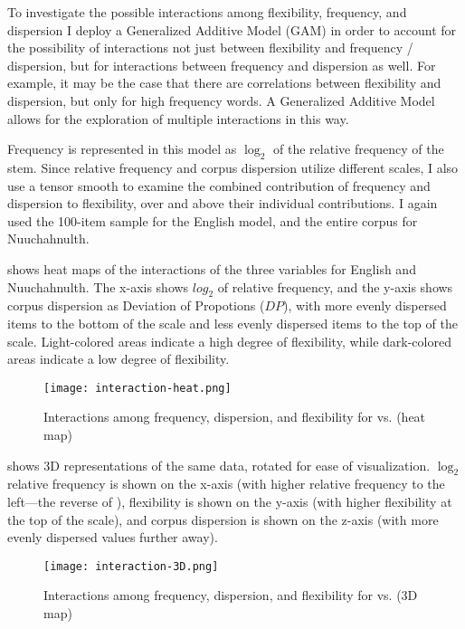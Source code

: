 To investigate the possible interactions among flexibility, frequency, and dispersion I deploy a Generalized Additive Model (GAM) in order to account for the possibility of interactions not just between flexibility and frequency / dispersion, but for interactions between frequency and dispersion as well. For example, it may be the case that there are correlations between flexibility and dispersion, but only for high frequency words. A Generalized Additive Model allows for the exploration of multiple interactions in this way.

Frequency is represented in this model as $\log_2$ of the relative frequency of the stem. Since relative frequency and corpus dispersion utilize different scales, I also use a tensor smooth to examine the combined contribution of frequency and dispersion to flexibility, over and above their individual contributions. I again used the 100-item sample for the English model, and the entire corpus for Nuuchahnulth.

 shows heat maps of the interactions of the three variables for English and Nuuchahnulth. The x-axis shows $log_2$ of relative frequency, and the y-axis shows corpus dispersion as Deviation of Propotions ($DP$), with more evenly dispersed items to the bottom of the scale and less evenly dispersed items to the top of the scale. Light-colored areas indicate a high degree of flexibility, while dark-colored areas indicate a low degree of flexibility.

\begin{figure}
  \centering
  \caption{Interactions among frequency, dispersion, and flexibility for  vs.  (heat map)}
  \label{fig:interaction-heat}
  \texttt{[image: interaction-heat.png]}
\end{figure}

 shows 3D representations of the same data, rotated for ease of visualization. $\log_2$ relative frequency is shown on the x-axis (with higher relative frequency to the left—the reverse of ), flexibility is shown on the y-axis (with higher flexibility at the top of the scale), and corpus dispersion is shown on the z-axis (with more evenly dispersed values further away).

\begin{figure}
  \centering
  \caption{Interactions among frequency, dispersion, and flexibility for  vs.  (3D map)}
  \label{fig:interaction-3D}
  \texttt{[image: interaction-3D.png]}
\end{figure}

